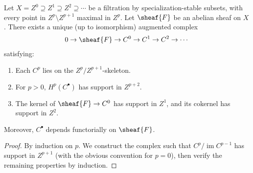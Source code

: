 \setcounter{page}{233}
\begin{proposition}
Let \(X = Z^0 \supseteq Z^1 \supseteq Z^2 \supseteq \cdots\) be a filtration by specialization-stable subsets, with every point in \(Z^p\setminus Z^{p+1}\) maximal in \(Z^p\). Let \(\sheaf{F}\) be an abelian sheaf on \(X\). There exists a unique (up to isomorphism) augmented complex
\[
0 \to \sheaf{F} \to C^0 \to C^1 \to C^2 \to \cdots
\]
satisfying:
\begin{enumerate}
\item[\textup{(a)}] Each \(C^p\) lies on the \(Z^p/Z^{p+1}\)-skeleton.
\item[\textup{(b)}] For \(p>0\), \(H^p(C^\bullet)\) has support in \(Z^{p+2}\).
\item[\textup{(c)}] The kernel of \(\sheaf{F}\to C^0\) has support in \(Z^1\), and its cokernel has support in \(Z^2\).
\end{enumerate}
Moreover, \(C^\bullet\) depends functorially on \(\sheaf{F}\).
\end{proposition}

\begin{proof}
By induction on \(p\). We construct the complex such that \(C^p/\operatorname{im}C^{p-1}\) has support in \(Z^{p+1}\) (with the obvious convention for \(p=0\)), then verify the remaining properties by induction.
\end{proof}
